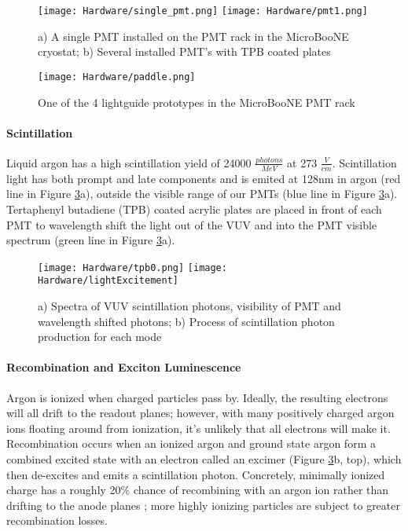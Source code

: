 \begin{figure}[H]
\centering
\texttt{[image: Hardware/single\_pmt.png]}
\hspace{3 mm}
\texttt{[image: Hardware/pmt1.png]}
\caption{ a) A single PMT installed on the PMT rack in the MicroBooNE cryostat; b) Several installed PMT's with TPB coated plates  } 
\label{fig:pmt}
\end{figure}

\begin{figure}[H]
\centering
\texttt{[image: Hardware/paddle.png]}
\caption{One of the 4 lightguide prototypes in the MicroBooNE PMT rack}
\label{fig:paddle}
\end{figure}

\paragraph{Scintillation}
\par Liquid argon has a high scintillation yield of 24000 $\frac{photons}{MeV}$ at 273 $\frac{V}{cm}$.  Scintillation light has both prompt and late components and is emited at 128nm in argon (red line in Figure \ref{fig:decay}a), outside the visible range of our PMTs (blue line in Figure \ref{fig:decay}a). Tertaphenyl butadiene (TPB) coated acrylic plates are placed in front of each PMT to wavelength shift the light out of the VUV and into the PMT visible spectrum (green line in Figure \ref{fig:decay}a). 

\begin{figure}[h!]
\centering
\texttt{[image: Hardware/tpb0.png]}
\hspace{1 mm}
\texttt{[image: Hardware/lightExcitement]} %
\caption{ a) Spectra of VUV scintillation photons, visibility of PMT and wavelength shifted photons; b) Process of scintillation photon production for each mode  } 
\label{fig:decay}
\end{figure}


\paragraph{Recombination and Exciton Luminescence}

\par Argon is ionized when charged particles pass by. Ideally, the resulting electrons will all drift to the readout planes; however, with many positively charged argon ions floating around from ionization, it's unlikely that all electrons will make it. Recombination occurs when an ionized argon and ground state argon form a combined excited state with an electron called an excimer (Figure \ref{fig:decay}b, top), which then de-excites and emits a scintillation photon. Concretely, minimally ionized charge has a roughly 20\% chance of recombining with an argon ion rather than drifting to the anode planes \cite{bib:sorel}; more highly ionizing particles are subject to greater recombination losses. 

